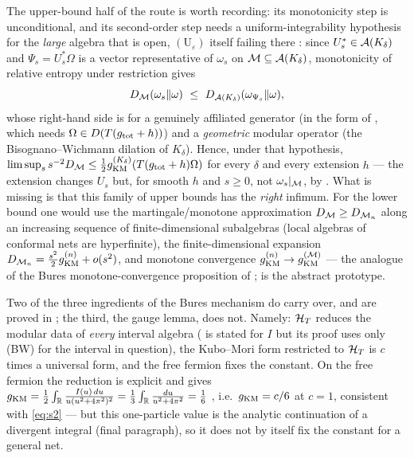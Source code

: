 The upper-bound half of the route is worth recording: its monotonicity step is unconditional, and its second-order step
needs a uniform-integrability hypothesis for the \emph{large} algebra that is open, $(\mathrm U_{\varepsilon})$ itself failing there \cite{RigorRK}: since $U_{s}^{*}\in\mathcal A(K_{\delta})$ and
$\Psi_{s}=U_{s}^{*}\Omega$ is a vector representative of $\omega_{s}$ on $\mathcal M\subseteq\mathcal A(K_{\delta})$,
monotonicity of relative entropy under restriction gives
\begin{equation}\label{eq:kmmono}
 D_{\cM}(\omega_{s}\Vert\omega)\ \le\ D_{\cA(K_{\delta})}(\omega_{\Psi_{s}}\Vert\omega),
\end{equation}
whose right-hand side is  for a genuinely affiliated generator (in the form of \cite[Prop.~8.1]{RigorKM}, which needs $\Omega\in D(T(g_{\rm tot}+h))$) and a \emph{geometric}
modular operator (the Bisognano--Wichmann dilation of $K_{\delta}$).  Hence, under that hypothesis,
$\limsup_{s}s^{-2}D_{\mathcal M}\le\frac12g_{\mathrm{KM}}^{(K_{\delta})}(T(g_{\rm tot}+h)\Omega)$ for every $\delta$ and every
extension $h$ --- the extension changes $U_{s}$ but, for smooth $h$ and $s\ge0$, not $\omega_{s}|_{\mathcal M}$, by .  What is
missing is that this family of upper bounds has the \emph{right} infimum.  For the lower bound one would
use the martingale/monotone approximation $D_{\mathcal M}\ge D_{\mathcal M_{n}}$ along an increasing sequence of
finite-dimensional subalgebras (local algebras of conformal nets are hyperfinite), the finite-dimensional
expansion $D_{\mathcal M_{n}}=\frac{s^{2}}{2}g_{\mathrm{KM}}^{(n)}+o(s^{2})$, and monotone convergence
$g_{\mathrm{KM}}^{(n)}\to g_{\mathrm{KM}}^{(\mathcal M)}$ --- the analogue of the Bures monotone-convergence proposition of
\cite{RigorSV};  is the abstract prototype.

Two of the three ingredients of the Bures mechanism do carry over, and are proved in \cite{RigorRK};
the third, the gauge lemma, does not.  Namely: $\mathcal H_T$ reduces the modular data of
\emph{every} interval algebra ( is stated for $I$ but its proof uses only (BW) for the
interval in question), the Kubo--Mori form restricted to $\mathcal H_T$ is $c$ times a universal form, and the free
fermion fixes the constant.  On the free fermion the reduction is explicit and gives
$g_{\mathrm{KM}}=\frac12\int_{\mathbb R}\frac{I(u)\,du}{u(u^{2}+4\pi^{2})^{2}}
=\frac13\int_{\mathbb R}\frac{du}{u^{2}+4\pi^{2}}=\frac16$ \cite[\S7]{RigorKM}, i.e.\ $g_{\mathrm{KM}}=c/6$ at $c=1$,
consistent with \eqref{eq:s2} --- but this one-particle value is the analytic continuation of a divergent
integral (final paragraph), so it does not by itself fix the constant for a general net.

